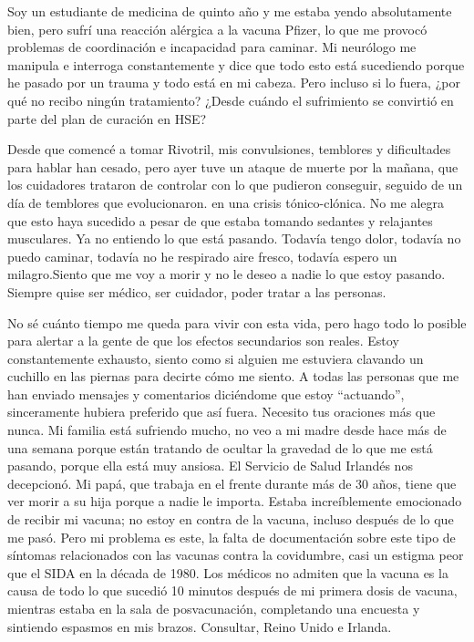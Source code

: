 Soy un estudiante de medicina de quinto año y me estaba yendo absolutamente
bien, pero sufrí una reacción alérgica a la vacuna Pfizer, lo que me provocó
problemas de coordinación e incapacidad para caminar. Mi neurólogo me manipula e
interroga constantemente y dice que todo esto está sucediendo porque he pasado
por un trauma y todo está en mi cabeza. Pero incluso si lo fuera, ¿por qué no
recibo ningún tratamiento? ¿Desde cuándo el sufrimiento se convirtió en parte
del plan de curación en HSE?

Desde que comencé a tomar Rivotril, mis convulsiones, temblores y dificultades
para hablar han cesado, pero ayer tuve un ataque de muerte por la mañana, que
los cuidadores trataron de controlar con lo que pudieron conseguir, seguido de
un día de temblores que evolucionaron. en una crisis tónico-clónica. No me
alegra que esto haya sucedido a pesar de que estaba tomando sedantes y
relajantes musculares. Ya no entiendo lo que está pasando. Todavía tengo dolor,
todavía no puedo caminar, todavía no he respirado aire fresco, todavía espero un
milagro.Siento que me voy a morir y no le deseo a nadie lo que estoy
pasando. Siempre quise ser médico, ser cuidador, poder tratar a las personas.

No sé cuánto tiempo me queda para vivir con esta vida, pero hago todo lo posible
para alertar a la gente de que los efectos secundarios son reales. Estoy
constantemente exhausto, siento como si alguien me estuviera clavando un
cuchillo en las piernas para decirte cómo me siento. A todas las personas que me
han enviado mensajes y comentarios diciéndome que estoy “actuando”, sinceramente
hubiera preferido que así fuera. Necesito tus oraciones más que nunca. Mi
familia está sufriendo mucho, no veo a mi madre desde hace más de una semana
porque están tratando de ocultar la gravedad de lo que me está pasando, porque
ella está muy ansiosa. El Servicio de Salud Irlandés nos decepcionó. Mi papá,
que trabaja en el frente durante más de 30 años, tiene que ver morir a su hija
porque a nadie le importa. Estaba increíblemente emocionado de recibir mi
vacuna; no estoy en contra de la vacuna, incluso después de lo que me pasó. Pero
mi problema es este, la falta de documentación sobre este tipo de síntomas
relacionados con las vacunas contra la covidumbre, casi un estigma peor que el
SIDA en la década de 1980. Los médicos no admiten que la vacuna es la causa de
todo lo que sucedió 10 minutos después de mi primera dosis de vacuna, mientras
estaba en la sala de posvacunación, completando una encuesta y sintiendo
espasmos en mis brazos. Consultar, Reino Unido e Irlanda.

